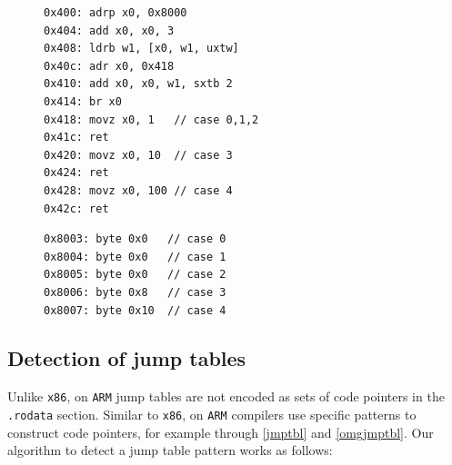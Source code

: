 \documentclass[a4paper,11pt,oneside]{report}
\begin{document}
\begin{figure}[h]
\begin{minipage}{.50\textwidth}
\begin{lstlisting}[basicstyle=\ttfamily\small,numbers=none]
0x400: adrp x0, 0x8000
0x404: add x0, x0, 3
0x408: ldrb w1, [x0, w1, uxtw]
0x40c: adr x0, 0x418
0x410: add x0, x0, w1, sxtb 2
0x414: br x0
0x418: movz x0, 1   // case 0,1,2
0x41c: ret
0x420: movz x0, 10  // case 3
0x424: ret
0x428: movz x0, 100 // case 4
0x42c: ret
\end{lstlisting}
\end{minipage}\hfill
\begin{minipage}{.45\textwidth}
\begin{lstlisting}[basicstyle=\ttfamily\small,numbers=none]
0x8003: byte 0x0   // case 0
0x8004: byte 0x0   // case 1
0x8005: byte 0x0   // case 2
0x8006: byte 0x8   // case 3
0x8007: byte 0x10  // case 4
\end{lstlisting}
\end{minipage}
\label{omgjmptbl}
\end{figure}



\subsection{Detection of jump tables}
Unlike \texttt{x86}, on \texttt{ARM} jump tables are not encoded as sets of code
pointers in the \texttt{.rodata} section.
Similar to \texttt{x86}, on \texttt{ARM} compilers use specific patterns to construct
code pointers, for example through
\autoref{jmptbl} and \autoref{omgjmptbl}. 
Our algorithm to detect a jump table pattern works as follows:
\end{document}
